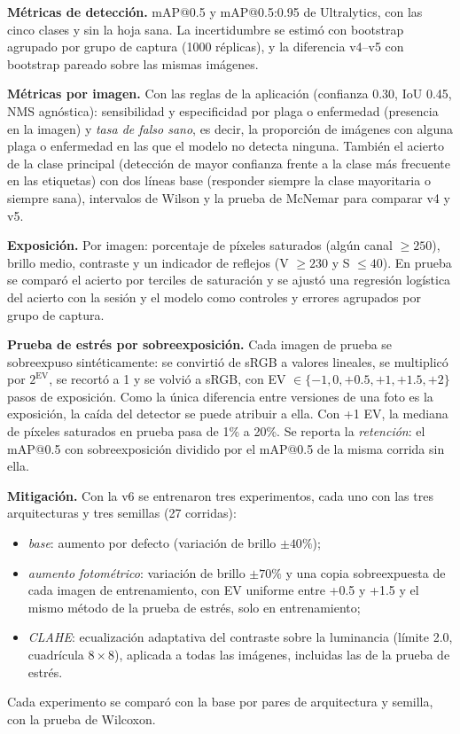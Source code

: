 \documentclass[sensors,article,submit,pdftex,moreauthors]{Definitions/mdpi}
\begin{document}
{\color{blue} \textbf{Métricas de detección.} mAP@0.5 y mAP@0.5:0.95 de Ultralytics, con las cinco clases y sin la hoja sana.} {\color{blue} La incertidumbre se estimó con bootstrap agrupado por grupo de captura (1000 réplicas), y la diferencia v4--v5 con bootstrap pareado sobre las mismas imágenes.}

{\color{blue} \textbf{Métricas por imagen.} Con las reglas de la aplicación (confianza 0.30, IoU 0.45, NMS agnóstica): sensibilidad y especificidad por plaga o enfermedad (presencia en la imagen) y \emph{tasa de falso sano}, es decir, la proporción de imágenes con alguna plaga o enfermedad en las que el modelo no detecta ninguna.} {\color{blue} También el acierto de la clase principal (detección de mayor confianza frente a la clase más frecuente en las etiquetas) con dos líneas base (responder siempre la clase mayoritaria o siempre sana), intervalos de Wilson y la prueba de McNemar para comparar v4 y v5.}

{\color{blue} \textbf{Exposición.} Por imagen: porcentaje de píxeles saturados (algún canal $\geq 250$), brillo medio, contraste y un indicador de reflejos (V $\geq 230$ y S $\leq 40$).} {\color{blue} En prueba se comparó el acierto por terciles de saturación y se ajustó una regresión logística del acierto con la sesión y el modelo como controles y errores agrupados por grupo de captura.}

{\color{blue} \textbf{Prueba de estrés por sobreexposición.} Cada imagen de prueba se sobreexpuso sintéticamente: se convirtió de sRGB a valores lineales, se multiplicó por $2^{\mathrm{EV}}$, se recortó a 1 y se volvió a sRGB, con EV $\in \{-1, 0, +0.5, +1, +1.5, +2\}$ pasos de exposición.} {\color{blue} Como la única diferencia entre versiones de una foto es la exposición, la caída del detector se puede atribuir a ella.} {\color{blue} Con +1 EV, la mediana de píxeles saturados en prueba pasa de 1\% a 20\%.} {\color{blue} Se reporta la \emph{retención}: el mAP@0.5 con sobreexposición dividido por el mAP@0.5 de la misma corrida sin ella.}

{\color{blue} \textbf{Mitigación.} Con la v6 se entrenaron tres experimentos, cada uno con las tres arquitecturas y tres semillas (27 corridas):}
{\color{blue}
\begin{itemize}[leftmargin=*,labelsep=4.9mm]
\item \emph{base}: aumento por defecto (variación de brillo $\pm 40\%$);
\item \emph{aumento fotométrico}: variación de brillo $\pm 70\%$ y una copia sobreexpuesta de cada imagen de entrenamiento, con EV uniforme entre +0.5 y +1.5 y el mismo método de la prueba de estrés, solo en entrenamiento;
\item \emph{CLAHE}: ecualización adaptativa del contraste sobre la luminancia (límite 2.0, cuadrícula $8\times8$), aplicada a todas las imágenes, incluidas las de la prueba de estrés.
\end{itemize}
Cada experimento se comparó con la base por pares de arquitectura y semilla, con la prueba de Wilcoxon.
}
\end{document}
